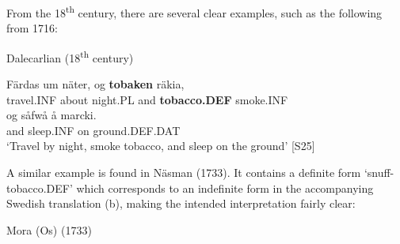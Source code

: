 
From the 18\textsuperscript{th} century, there are several clear examples, such as the following from 1716:


\item 

Dalecarlian (18\textsuperscript{th} century)



 \ea\label{}
\gll Färdas  um  näter,  og  \textbf{tobaken} räkia,\\


travel.INF  about  night.PL  and  \textbf{tobacco.DEF} smoke.INF\\

 \ea\label{}
\gll og  såfwå  å  marcki.\\


and  sleep.INF  on   ground.DEF.DAT\\

\glt ‘Travel by night, smoke tobacco, and sleep on the ground’ [S25] 

\z

A similar example is found in Näsman (1733). It contains a definite form  ‘snuff-tobacco.DEF’ which corresponds to an indefinite form in the accompanying Swedish translation (b), making the intended interpretation fairly clear:


\item 


\item 

Mora (Os) (1733)

